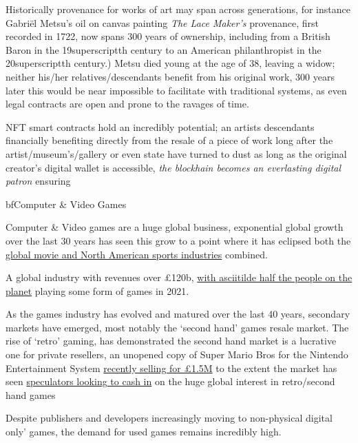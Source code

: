 Historically provenance for works of art may span across generations,
for instance Gabriël Metsu's oil on canvas painting \emph{The Lace
Maker's} provenance, first recorded in 1722, now spans 300 years of
ownership, including from a British Baron in the 19superscript{th}
century to an American philanthropist in the 20superscript{th}
century.) Metsu died young at the age of 38, leaving a widow; neither
his/her relatives/descendants benefit from his original work, 300 years
later this would be near impossible to facilitate with traditional
systems, as even legal contracts are open and prone to the ravages of
time.

NFT smart contracts hold an incredibly potential; an artists descendants
financially benefiting directly from the resale of a piece of work long
after the artist/museum's/gallery or even state have turned to dust as
long as the original creator's digital wallet is accessible, \emph{the
blockhain becomes an everlasting digital patron} ensuring

bf{Computer \& Video Games}

Computer \& Video games are a huge global business, exponential global
growth over the last 30 years has seen this grow to a point where it has
eclipsed both the
\href{https://www.businessinsider.com/video-game-industry-revenues-exceed-sports-and-film-combined-idc-2020-12?r=US\&IR=T}{global
movie and North American sports industries} combined.

A global industry with revenues over £120b,
\href{https://www.wepc.com/news/video-game-statistics/}{with
asciitilde half the people on the planet} playing some form of
games in 2021.

As the games industry has evolved and matured over the last 40 years,
secondary markets have emerged, most notably the `second hand' games
resale market. The rise of `retro' gaming, has demonstrated the second
hand market is a lucrative one for private resellers, an unopened copy
of Super Mario Bros for the Nintendo Entertainment System
\href{https://www.nytimes.com/2021/08/06/business/super-mario-bros-sale-record.html}{recently
selling for £1.5M} to the extent the market has seen
\href{https://www.businessinsider.com/retro-gaming-market-being-overtaken-by-speculators-2021-9?r=US\&IR=T}{speculators
looking to cash in} on the huge global interest in retro/second hand
games

Despite publishers and developers increasingly moving to non-physical
digital only' games, the demand for used games remains incredibly high.

